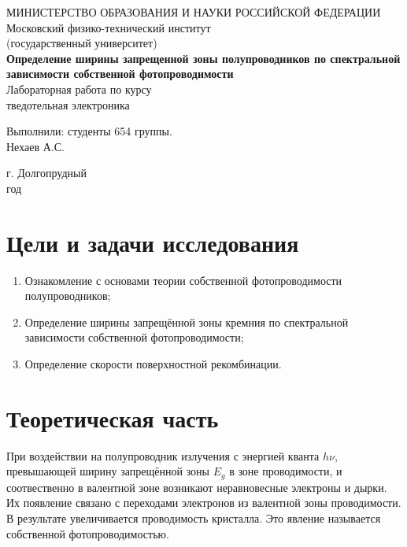 \documentclass[a4paper, 12pt]{article}
\begin{document}
	\begin{titlepage}
		\begin{center}
		МИНИСТЕРСТВО ОБРАЗОВАНИЯ И НАУКИ РОССИЙСКОЙ ФЕДЕРАЦИИ\\
		\footnotesize{Московский физико-технический институт}\\
		\footnotesize{(государственный университет)}\\
		\vfill
		{\LARGE
		\textbf{Определение ширины запрещенной зоны полупроводников по спектральной зависимости собственной фотопроводимости}\\
		}
		\vspace{1cm}
		Лабораторная работа по курсу\\
		тведотельная электроника
		\vfill
		\begin{flushright}
			Выполнили: студенты 654 группы.\\
			Нехаев А.С.\\
		\end{flushright}
		\vfill
		г. Долгопрудный\\
		\the\year\:год
		\end{center}
	\end{titlepage}
	\newpage
	\tableofcontents
	\newpage
	\section{Цели и задачи исследования}
	\begin{enumerate}
		\item Ознакомление с основами теории собственной фотопроводимости полупроводников;
		\item Определение ширины запрещённой зоны кремния по спектральной зависимости собственной фотопроводимости;
		\item Определение скорости поверхностной рекомбинации.
    \end{enumerate}
    \section{Теоретическая часть}
    При воздействии на полупроводник излучения с энергией кванта $h\nu$, превышающей ширину запрещённой зоны $E_g$ в зоне проводимости, и соотвественно в валентной зоне возникают неравновесные электроны и дырки. Их появление связано с переходами электронов из валентной зоны проводимости. В результате увеличивается проводимость кристалла. Это явление называется собственной фотопроводимостью.
\end{document}
